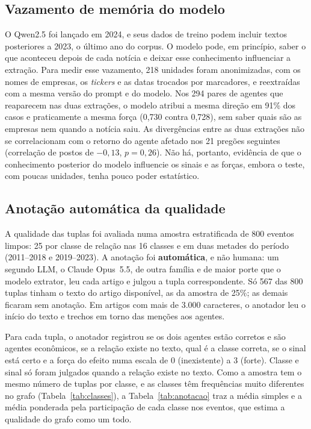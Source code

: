\subsection{Vazamento de memória do modelo}

O Qwen2.5 foi lançado em 2024, e seus dados de treino podem incluir textos posteriores a 2023, o último
ano do corpus. O modelo pode, em princípio, saber o que aconteceu depois de cada notícia e deixar esse
conhecimento influenciar a extração. Para medir esse vazamento, 218 unidades foram anonimizadas, com os
nomes de empresas, os \emph{tickers} e as datas trocados por marcadores, e reextraídas com a mesma versão
do prompt e do modelo. Nos 294 pares de agentes que reaparecem nas duas extrações, o modelo atribui a mesma
direção em 91\% dos casos e praticamente a mesma força (0,730 contra 0,728), sem saber quais são as
empresas nem quando a notícia saiu. As divergências entre as duas extrações não se correlacionam com o
retorno do agente afetado nos 21 pregões seguintes (correlação de postos de $-0{,}13$, $p=0{,}26$). Não há,
portanto, evidência de que o conhecimento posterior do modelo influencie os sinais e as forças, embora o
teste, com poucas unidades, tenha pouco poder estatístico.

\subsection{Anotação automática da qualidade}
\label{sec:anotacao}

A qualidade das tuplas foi avaliada numa amostra estratificada de 800 eventos limpos: 25 por classe de
relação nas 16 classes e em duas metades do período (2011--2018 e 2019--2023). A anotação foi
\textbf{automática}, e não humana: um segundo LLM, o Claude Opus~5.5, de outra família e de maior porte
que o modelo extrator, leu cada artigo e julgou a tupla correspondente. Só 567 das 800 tuplas tinham o
texto do artigo disponível, as da amostra de 25\%; as demais ficaram sem anotação. Em artigos com mais
de 3.000 caracteres, o anotador leu o início do texto e trechos em torno das menções aos agentes.

Para cada tupla, o anotador registrou se os dois agentes estão corretos e são agentes econômicos, se a
relação existe no texto, qual é a classe correta, se o sinal está certo e a força do efeito numa escala
de 0 (inexistente) a 3 (forte). Classe e sinal só foram julgados quando a relação existe no texto. Como a
amostra tem o mesmo número de tuplas por classe, e as classes têm frequências muito diferentes no grafo
(Tabela~\ref{tab:classes}), a Tabela~\ref{tab:anotacao} traz a média simples e a média ponderada pela
participação de cada classe nos eventos, que estima a qualidade do grafo como um todo.

